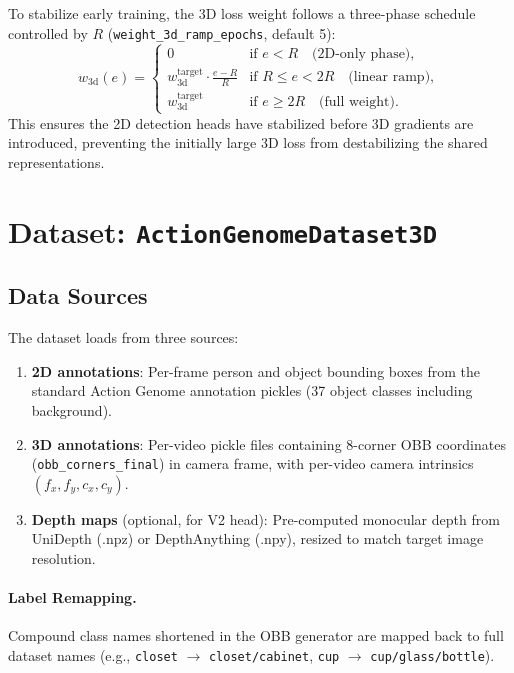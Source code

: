 \documentclass[runningheads]{llncs}
\begin{document}
To stabilize early training, the 3D loss weight follows a three-phase schedule controlled by $R$ (\texttt{weight\_3d\_ramp\_epochs}, default 5):
\begin{equation}
    w_{\text{3d}}(e) = \begin{cases}
        0 & \text{if } e < R \quad \text{(2D-only phase)}, \\
        w_{\text{3d}}^{\text{target}} \cdot \frac{e - R}{R} & \text{if } R \leq e < 2R \quad \text{(linear ramp)}, \\
        w_{\text{3d}}^{\text{target}} & \text{if } e \geq 2R \quad \text{(full weight)}.
    \end{cases}
    \label{eq:ramp}
\end{equation}
This ensures the 2D detection heads have stabilized before 3D gradients are introduced, preventing the initially large 3D loss from destabilizing the shared representations.


\section{Dataset: \texttt{ActionGenomeDataset3D}}
\label{sec:dataset}

\subsection{Data Sources}

The dataset loads from three sources:
\begin{enumerate}
    \item \textbf{2D annotations}: Per-frame person and object bounding boxes from the standard Action Genome annotation pickles (37 object classes including background).
    \item \textbf{3D annotations}: Per-video pickle files containing 8-corner OBB coordinates (\texttt{obb\_corners\_final}) in camera frame, with per-video camera intrinsics $(f_x, f_y, c_x, c_y)$.
    \item \textbf{Depth maps} (optional, for V2 head): Pre-computed monocular depth from UniDepth (.npz) or DepthAnything (.npy), resized to match target image resolution.
\end{enumerate}

\paragraph{Label Remapping.}  Compound class names shortened in the OBB generator are mapped back to full dataset names (e.g., \texttt{closet} $\to$ \texttt{closet/cabinet}, \texttt{cup} $\to$ \texttt{cup/glass/bottle}).
\end{document}
